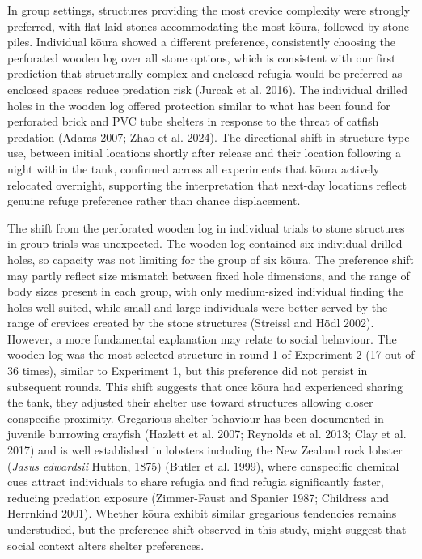 \documentclass[
  12pt,
  a4paper,
]{scrbook}
\begin{document}
In group settings, structures providing the most crevice complexity were
strongly preferred, with flat-laid stones accommodating the most kōura,
followed by stone piles. Individual kōura showed a different preference,
consistently choosing the perforated wooden log over all stone options,
which is consistent with our first prediction that structurally complex
and enclosed refugia would be preferred as enclosed spaces reduce
predation risk (Jurcak et al. 2016). The individual drilled holes in the
wooden log offered protection similar to what has been found for
perforated brick and PVC tube shelters in response to the threat of
catfish predation (Adams 2007; Zhao et al. 2024). The directional shift
in structure type use, between initial locations shortly after release
and their location following a night within the tank, confirmed across
all experiments that kōura actively relocated overnight, supporting the
interpretation that next-day locations reflect genuine refuge preference
rather than chance displacement.

The shift from the perforated wooden log in individual trials to stone
structures in group trials was unexpected. The wooden log contained six
individual drilled holes, so capacity was not limiting for the group of
six kōura. The preference shift may partly reflect size mismatch between
fixed hole dimensions, and the range of body sizes present in each
group, with only medium-sized individual finding the holes well-suited,
while small and large individuals were better served by the range of
crevices created by the stone structures (Streissl and Hödl 2002).
However, a more fundamental explanation may relate to social behaviour.
The wooden log was the most selected structure in round 1 of Experiment
2 (17 out of 36 times), similar to Experiment 1, but this preference did
not persist in subsequent rounds. This shift suggests that once kōura
had experienced sharing the tank, they adjusted their shelter use toward
structures allowing closer conspecific proximity. Gregarious shelter
behaviour has been documented in juvenile burrowing crayfish (Hazlett et
al. 2007; Reynolds et al. 2013; Clay et al. 2017) and is well
established in lobsters including the New Zealand rock lobster
(\emph{Jasus edwardsii} Hutton, 1875) (Butler et al. 1999), where
conspecific chemical cues attract individuals to share refugia and find
refugia significantly faster, reducing predation exposure (Zimmer-Faust
and Spanier 1987; Childress and Herrnkind 2001). Whether kōura exhibit
similar gregarious tendencies remains understudied, but the preference
shift observed in this study, might suggest that social context alters
shelter preferences.
\end{document}
